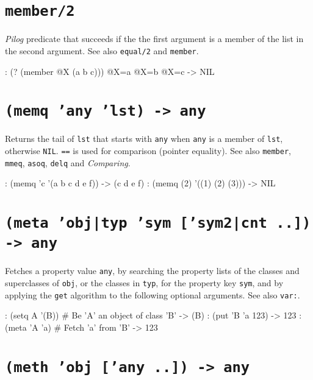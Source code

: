  
\section*{\texttt{member/2}}
\label{sec:func-ref-M-member/2}


\emph{Pilog} predicate that succeeds if the the first
argument is a member of the list in the second argument. See also
\texttt{equal/2} and \texttt{member}.


\begin{wideverbatim}
:  (? (member @X (a b c)))
 @X=a
 @X=b
 @X=c
-> NIL
\end{wideverbatim}

 
\section*{\texttt{(memq 'any 'lst) -> any}}
\label{sec:func-ref-M-(memq 'any 'lst) -> any}


Returns the tail of \texttt{lst} that starts with \texttt{any} when
\texttt{any} is a member of \texttt{lst}, otherwise \texttt{NIL}.
\texttt{==} is used for comparison (pointer equality). See also
\texttt{member}, \texttt{mmeq}, \texttt{asoq}, \texttt{delq} and
\emph{Comparing}.


\begin{wideverbatim}
: (memq 'c '(a b c d e f))
-> (c d e f)
: (memq (2) '((1) (2) (3)))
-> NIL
\end{wideverbatim}

 
\section*{\texttt{(meta 'obj|typ 'sym ['sym2|cnt ..]) -> any}}
\label{sec:func-ref-M-(meta 'obj|typ 'sym ['sym2|cnt ..]) -> any}


Fetches a property value \texttt{any}, by searching the property lists of the
classes and superclasses of \texttt{obj}, or the classes in \texttt{typ}, for the
property key \texttt{sym}, and by applying the \texttt{get} algorithm to the following
optional arguments. See also \texttt{var:}.


\begin{wideverbatim}
: (setq A '(B))            # Be 'A' an object of class 'B'
-> (B)
: (put 'B 'a 123)
-> 123
: (meta 'A 'a)             # Fetch 'a' from 'B'
-> 123
\end{wideverbatim}

 
\section*{\texttt{(meth 'obj ['any ..]) -> any}}
\label{sec:func-ref-M-(meth 'obj ['any ..]) -> any}


